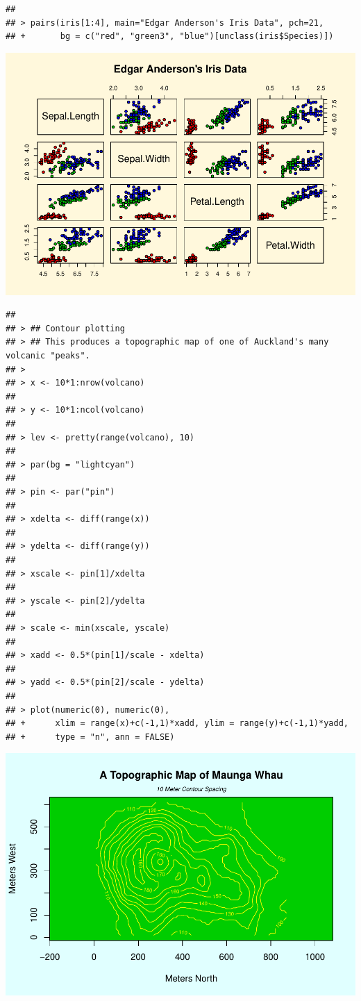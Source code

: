 \documentclass[
]{book}
\begin{document}
\begin{verbatim}
## 
## > pairs(iris[1:4], main="Edgar Anderson's Iris Data", pch=21,
## +       bg = c("red", "green3", "blue")[unclass(iris$Species)])
\end{verbatim}

\includegraphics{TudodoR_files/figure-latex/unnamed-chunk-147-9.pdf}

\begin{verbatim}
## 
## > ## Contour plotting
## > ## This produces a topographic map of one of Auckland's many volcanic "peaks".
## > 
## > x <- 10*1:nrow(volcano)
## 
## > y <- 10*1:ncol(volcano)
## 
## > lev <- pretty(range(volcano), 10)
## 
## > par(bg = "lightcyan")
## 
## > pin <- par("pin")
## 
## > xdelta <- diff(range(x))
## 
## > ydelta <- diff(range(y))
## 
## > xscale <- pin[1]/xdelta
## 
## > yscale <- pin[2]/ydelta
## 
## > scale <- min(xscale, yscale)
## 
## > xadd <- 0.5*(pin[1]/scale - xdelta)
## 
## > yadd <- 0.5*(pin[2]/scale - ydelta)
## 
## > plot(numeric(0), numeric(0),
## +      xlim = range(x)+c(-1,1)*xadd, ylim = range(y)+c(-1,1)*yadd,
## +      type = "n", ann = FALSE)
\end{verbatim}

\includegraphics{TudodoR_files/figure-latex/unnamed-chunk-147-10.pdf}
\end{document}

